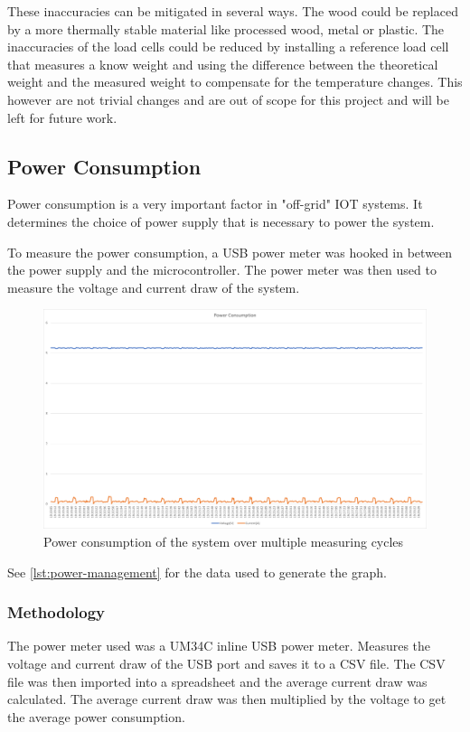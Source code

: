 These inaccuracies can be mitigated in several ways. The wood could be replaced by a more thermally stable material like processed wood, metal or plastic. The inaccuracies of the load cells could be reduced by installing a reference load cell that measures a know weight and using the difference between the theoretical weight and the measured weight to compensate for the temperature changes. This however are not trivial changes and are out of scope for this project and will be left for future work.

\subsection{Power Consumption}
Power consumption is a very important factor in "off-grid" IOT systems. It determines the choice of power supply that is necessary to power the system.

To measure the power consumption, a USB power meter was hooked in between the power supply and the microcontroller. The power meter was then used to measure the voltage and current draw of the system.

\begin{figure}
    \centering
    \includegraphics[width=1\textwidth]{figures/power_consumption_graph.png}
    \caption{Power consumption of the system over multiple measuring cycles}
    \label{fig:power_consumption}
\end{figure}
See \ref{lst:power-management} for the data used to generate the graph.

\subsubsection{Methodology}
The power meter used was a UM34C inline USB power meter. Measures the voltage and current draw of the USB port and saves it to a CSV file. The CSV file was then imported into a spreadsheet and the average current draw was calculated. The average current draw was then multiplied by the voltage to get the average power consumption.

